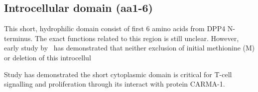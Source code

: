 \subsection{Introcellular domain (aa1-6)}

This short, hydrophilic domain consist of first 6 amino acids from DPP4 N-terminus. The exact functions related to this region is still unclear. However, early study by~\citet{Hong1990} has demonstrated that neither exclusion of initial methionine (M) or deletion of this  introcellul

Study has demonstrated the short cytoplasmic domain is critical for T-cell signalling and proliferation through its interact with protein CARMA-1. \cite{Ohnuma_2007}